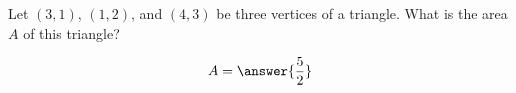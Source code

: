 \documentclass{ximera}
\author{Gregory Hartman \and Matthew Carr}
\begin{document}
\begin{exercise}
Let $(3,1)$, $(1,2)$, and $(4,3)$ be three vertices of a triangle. What is the area $A$ of this triangle?
\begin{prompt}
\[
A=\answer{\frac{5}{2}}
\]
\end{prompt}


\end{exercise}
\end{document}
